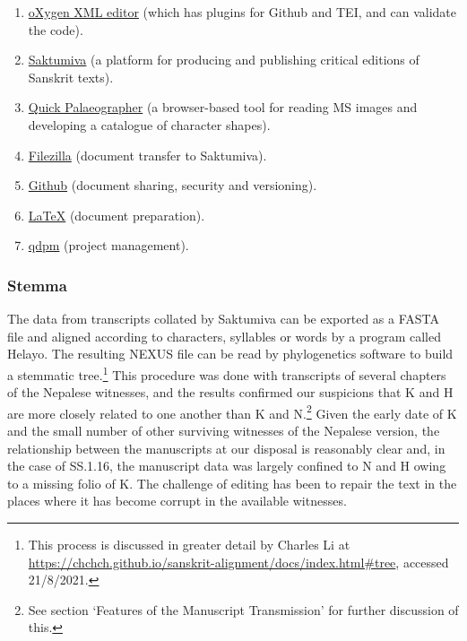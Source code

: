 \begin{enumerate}
    \item
    \href{https://www.oxygenxml.com.}{oXygen XML editor} (which has plugins for Github and TEI, and can validate the code).%
    
       \item
        \href{http://saktumiva.org.}{Saktumiva} (a platform for producing and publishing critical editions of Sanskrit texts).%
        \item
         \href{https://tst.hypotheses.org/1738.}{Quick Palaeographer} (a browser-based tool for reading MS images and developing a catalogue of character shapes).%

        \item
         \href{https://filezilla-project.org.}{Filezilla} (document transfer to Saktumiva).%
        \item
         \href{https://github.com.}{Github} (document sharing, security and versioning).%
        \item
          \href{https://www.latex-project.org.}{LaTeX} (document preparation).%
         \item
           \href{https://qdpm.net.}{qdpm} (project management).%
          
\end{enumerate}

\subsubsection{Stemma}
The data from transcripts collated by Saktumiva can be exported as a FASTA file 
and aligned according to characters, syllables or words by a program called 
Helayo. The resulting NEXUS file can be read by phylogenetics software to build a 
stemmatic tree.\footnote{This process is discussed in greater detail by Charles Li 
at \url{https://chchch.github.io/sanskrit-alignment/docs/index.html\#tree}, 
accessed 21/8/2021.} This procedure was done with transcripts of several 
chapters of the Nepalese witnesses, and the results confirmed our suspicions that 
K and H are more closely related to one another than K and N.\footnote{See 
section `Features of the Manuscript Transmission' for further discussion of this.} 
Given the early date of K and the small number of other surviving witnesses of the 
Nepalese version, the relationship between the manuscripts at our disposal is 
reasonably clear and, in the case of SS.1.16, the manuscript data was largely 
confined to N and H owing to a missing folio of K. The challenge of editing has 
been to repair the text in the places where it has become corrupt in the
available witnesses. 

